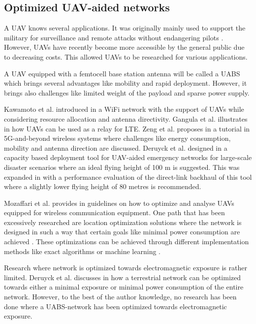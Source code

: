 \documentclass[twocolumn]{phdsymp} %
\begin{document}
\subsection{Optimized \gls{UAV}-aided networks}

A \gls{UAV} knows several applications. It was originally mainly used to support the military for surveillance and remote attacks without 
endangering pilots \cite{U12}. However, \gls{UAV}s have recently become more accessible by the general public due to decreasing costs. This 
allowed \gls{UAV}s to be researched for various applications.

A \gls{UAV} equipped with a femtocell base station antenna will be called a \gls{UABS}
which brings several advantages like mobility and rapid deployment. 
However, it brings also challenges like limited weight of the payload and sparse power supply.

Kawamoto et al. introduced in \cite{U11} a WiFi network with the support of  \gls{UAV}s while considering resource allocation 
and antenna directivity. 
Gangula et al. illustrates in \cite{U10} how \gls{UAV}s can be used as a relay for LTE. 
Zeng et al. proposes in  \cite{U12} a tutorial in 5G-and-beyond wireless systems where challenges like 
energy consumption, mobility and antenna direction are discussed. 
Deruyck et al. designed in \cite{J2} a capacity based deployment tool for UAV-aided emergency
networks for large-scale disaster scenarios where an ideal flying height of 100 m is suggested. This was expanded 
in \cite{U1} with a performance evaluation of the direct-link backhaul of this tool where a slightly lower 
flying height of 80 metres is recommended.


Mozaffari et al. provides in \cite{U3} guidelines on how to optimize and analyse \gls{UAV}s equipped for 
wireless communication equipment.
One path that has been excessively researched are location optimization solutions where the network is 
designed in such a way that certain goals like minimal power consumption are achieved \cite{U6,U7,U8,U9}.
These optimizations can be achieved through different implementation methods like exact algorithms or machine learning \cite{U3,U5}.

Research where network is optimized towards electromagnetic exposure is rather limited.
Deruyck et al. discusses in \cite{J1} how a terrestrial network can be optimized towards either a minimal exposure or minimal power consumption of the entire network.
However, to the best of the author knowledge, no research has been done where a \gls{UABS}-network has been optimized towards electromagnetic exposure.
\end{document}
